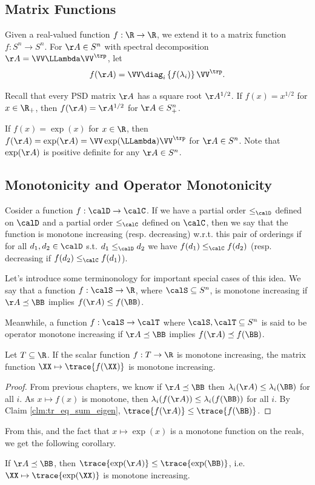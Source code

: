 \subsection{Matrix Functions}
\begin{definition}
  Given a real-valued function $f:\R\to\R$, we extend it to a matrix function $f:S^n\to S^n$.
  For $\AA\in S^n$ with spectral decomposition $\AA=\VV\LLambda\VV^\trp$, let
  \[ f(\AA) = \VV \diag_i\left\{f(\lambda_i)\right\} \VV^\trp. \]
\end{definition}
\begin{example}
  Recall that every PSD matrix $\AA$ has a square root $\AA^{1/2}$.
  If $f(x) = x^{1/2}$ for $x\in\R_+$, then $f(\AA)=\AA^{1/2}$ for $\AA\in S^n_+$.
\end{example}
\begin{example}
  If $f(x) = \exp(x)$ for $x\in\R$, then $f(\AA) = \exp(\AA) = \VV\exp(\LLambda)\VV^\trp$ for $\AA\in S^n$.
  Note that $\exp(\AA)$ is positive definite for any $\AA\in S^n$.
\end{example}

\subsection{Monotonicity and Operator Monotonicity}
 Cosider a function $f:
 \calD \to \calC$.
 If we have a partial order $\leq_{\calD}$ defined on $\calD$ and a
 partial order $\leq_{\calC}$ defined on $\calC$, then we say that
 the function is monotone increasing (resp. decreasing) w.r.t. this pair of orderings if for all $d_1, d_2
 \in \calD$ s.t. $d_1 \leq_{\calD} d_2$ we have $f(d_1) \leq_{\calC}
 f(d_2) $ (resp. decreasing if $f(d_2) \leq_{\calC} f(d_1)$).

Let's  introduce some terminonology for important special cases of this idea.
We say that a function $f : \calS \to \R$, where $\calS \subseteq \symsetn$,
  is monotone increasing if $\AA \preceq \BB$ implies $f(\AA) \leq f(\BB)$.

  Meanwhile, a function $f : \calS \to \calT$ where $\calS, \calT \subseteq \symsetn$
  is said to be operator monotone increasing if $\AA \preceq \BB $ implies
  $f(\AA) \preceq f(\BB)$.
%
\begin{lemma}\label{lem:trpmonoinc}
  Let $T \subseteq \R$.
  If the scalar function $f : T \to \R$ is monotone increasing, the matrix
  function $\XX \mapsto \trace{f(\XX)}$ is monotone increasing.
\end{lemma}
\begin{proof}
  From previous chapters, we know if $\AA\preceq\BB$ then $\lambda_i(\AA)\leq\lambda_i(\BB)$ for all $i$.
  As $x \mapsto f(x)$ is monotone, then $\lambda_i(f(\AA))\leq\lambda_i(f(\BB))$ for all $i$.
  By Claim \ref{clm:tr_eq_sum_eigen}, $\trace{f(\AA)}\leq\trace{f(\BB)}$.
\end{proof}
From this, and the fact that $x \mapsto \exp(x)$ is a monotone function on the
reals, we get the following corollary.
\begin{corollary}\label{cor:trexpmono}
  If $\AA\preceq\BB$, then $\trace{\exp(\AA)}\leq\trace{\exp(\BB)}$,
  i.e. $\XX \mapsto \trace{\exp(\XX)}$ is monotone increasing.
\end{corollary}

